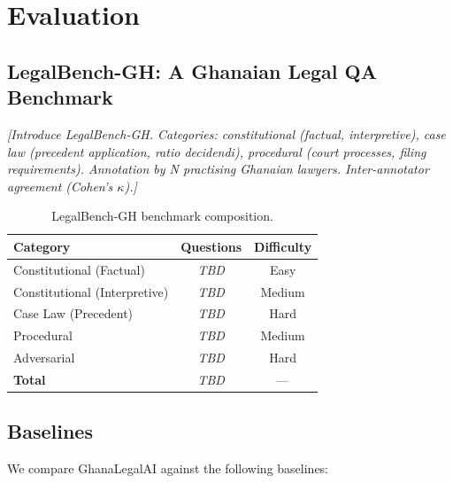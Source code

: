 \documentclass[11pt]{article}
\begin{document}
\section{Evaluation}
\label{sec:evaluation}

\subsection{LegalBench-GH: A Ghanaian Legal QA Benchmark}


\textit{[Introduce LegalBench-GH. Categories: constitutional (factual,
interpretive), case law (precedent application, ratio decidendi),
procedural (court processes, filing requirements). Annotation by
N practising Ghanaian lawyers. Inter-annotator agreement (Cohen's
$\kappa$).]}

\begin{table}[t]
\centering
\small
\begin{tabular}{lcc}
\toprule
\textbf{Category} & \textbf{Questions} & \textbf{Difficulty} \\
\midrule
Constitutional (Factual) & \textit{TBD} & Easy \\
Constitutional (Interpretive) & \textit{TBD} & Medium \\
Case Law (Precedent) & \textit{TBD} & Hard \\
Procedural & \textit{TBD} & Medium \\
Adversarial & \textit{TBD} & Hard \\
\midrule
\textbf{Total} & \textit{TBD} & --- \\
\bottomrule
\end{tabular}
\caption{LegalBench-GH benchmark composition.}
\label{tab:benchmark}
\end{table}


\subsection{Baselines}

We compare GhanaLegalAI against the following baselines:
\end{document}

